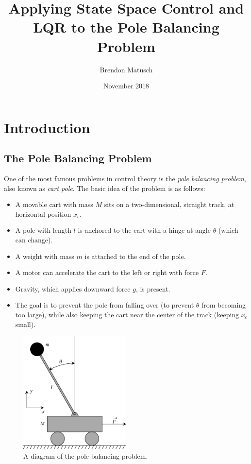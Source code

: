\documentclass[12pt]{article}
\begin{document}
\title{Applying State Space Control and LQR to the Pole Balancing Problem}
\author{Brendon Matusch}
\date{November 2018}
\maketitle

\section{Introduction}

\subsection{The Pole Balancing Problem} \label{problem}

One of the most famous problems in control theory is the \textit{pole balancing problem}, also known as \textit{cart pole}. The basic idea of the problem is as follows:

\begin{itemize}
    \item A movable cart with mass $M$ sits on a two-dimensional, straight track, at horizontal position $x _c$.
    \item A pole with length $l$ is anchored to the cart with a hinge at angle $\theta$ (which can change).
    \item A weight with mass $m$ is attached to the end of the pole.
    \item A motor can accelerate the cart to the left or right with force $F$.
    \item Gravity, which applies downward force $g$, is present.
    \item The goal is to prevent the pole from falling over (to prevent $\theta$ from becoming too large), while also keeping the cart near the center of the track (keeping $x _c$ small).
\end{itemize}

\begin{figure}[ht]
    \centering
    \includegraphics[width=0.5\textwidth]{cartpole}
    \caption{\label{cartpole} A diagram of the pole balancing problem.}
\end{figure}
\end{document}
